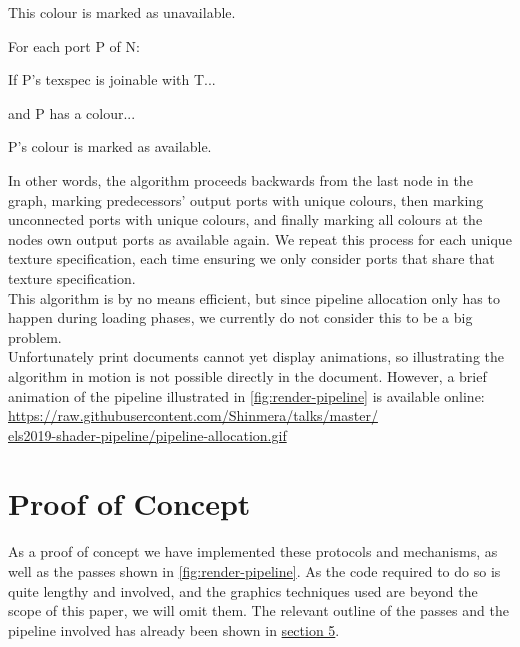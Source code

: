 \documentclass[format=sigconf]{acmart}
\begin{document}
\begin{step}
\begin{step}
\begin{step}
\begin{step}
      \item This colour is marked as unavailable.
      \end{step}
    \item For each port P of N:
      \begin{step}
      \item If P's texspec is joinable with T...
      \item and P has a colour...
      \item P's colour is marked as available.
      \end{step}
    \end{step}
  \end{step}
\end{step}

In other words, the algorithm proceeds backwards from the last node in the graph, marking predecessors' output ports with unique colours, then marking unconnected ports with unique colours, and finally marking all colours at the nodes own output ports as available again. We repeat this process for each unique texture specification, each time ensuring we only consider ports that share that texture specification. \\

This algorithm is by no means efficient, but since pipeline allocation only has to happen during loading phases, we currently do not consider this to be a big problem. \\

Unfortunately print documents cannot yet display animations, so illustrating the algorithm in motion is not possible directly in the document. However, a brief animation of the pipeline illustrated in \autoref{fig:render-pipeline} is available online: \\

\href{https://raw.githubusercontent.com/Shinmera/talks/master/els2019-shader-pipeline/pipeline-allocation.gif}{https://raw.githubusercontent.com/Shinmera/talks/master/\\els2019-shader-pipeline/pipeline-allocation.gif}

\section{Proof of Concept}\label{concept}
As a proof of concept we have implemented these protocols and mechanisms, as well as the passes shown in \autoref{fig:render-pipeline}. As the code required to do so is quite lengthy and involved, and the graphics techniques used are beyond the scope of this paper, we will omit them. The relevant outline of the passes and the pipeline involved has already been shown in \hyperref[pipelines]{section 5}. \\
\end{document}
